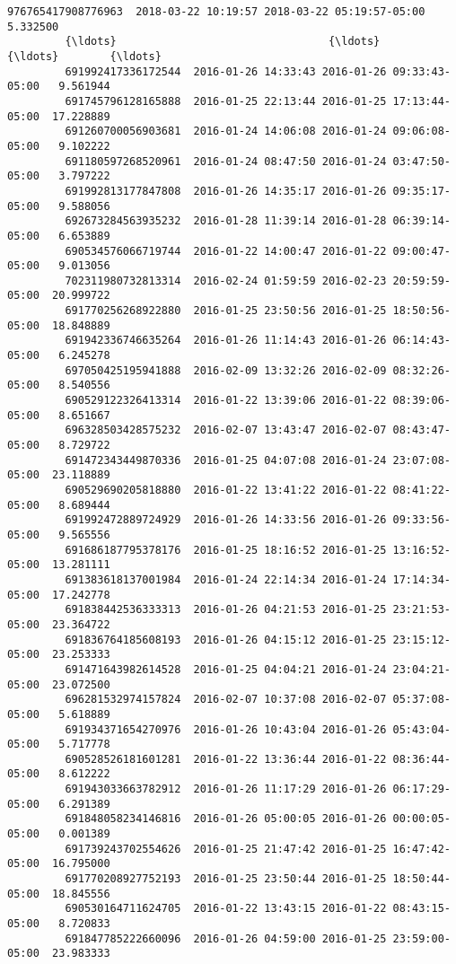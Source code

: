 \documentclass[11pt]{article}
\begin{document}
\begin{Verbatim}[commandchars=\\\{\}]
         976765417908776963  2018-03-22 10:19:57 2018-03-22 05:19:57-05:00   5.332500   
         {\ldots}                                 {\ldots}                       {\ldots}        {\ldots}   
         691992417336172544  2016-01-26 14:33:43 2016-01-26 09:33:43-05:00   9.561944   
         691745796128165888  2016-01-25 22:13:44 2016-01-25 17:13:44-05:00  17.228889   
         691260700056903681  2016-01-24 14:06:08 2016-01-24 09:06:08-05:00   9.102222   
         691180597268520961  2016-01-24 08:47:50 2016-01-24 03:47:50-05:00   3.797222   
         691992813177847808  2016-01-26 14:35:17 2016-01-26 09:35:17-05:00   9.588056   
         692673284563935232  2016-01-28 11:39:14 2016-01-28 06:39:14-05:00   6.653889   
         690534576066719744  2016-01-22 14:00:47 2016-01-22 09:00:47-05:00   9.013056   
         702311980732813314  2016-02-24 01:59:59 2016-02-23 20:59:59-05:00  20.999722   
         691770256268922880  2016-01-25 23:50:56 2016-01-25 18:50:56-05:00  18.848889   
         691942336746635264  2016-01-26 11:14:43 2016-01-26 06:14:43-05:00   6.245278   
         697050425195941888  2016-02-09 13:32:26 2016-02-09 08:32:26-05:00   8.540556   
         690529122326413314  2016-01-22 13:39:06 2016-01-22 08:39:06-05:00   8.651667   
         696328503428575232  2016-02-07 13:43:47 2016-02-07 08:43:47-05:00   8.729722   
         691472343449870336  2016-01-25 04:07:08 2016-01-24 23:07:08-05:00  23.118889   
         690529690205818880  2016-01-22 13:41:22 2016-01-22 08:41:22-05:00   8.689444   
         691992472889724929  2016-01-26 14:33:56 2016-01-26 09:33:56-05:00   9.565556   
         691686187795378176  2016-01-25 18:16:52 2016-01-25 13:16:52-05:00  13.281111   
         691383618137001984  2016-01-24 22:14:34 2016-01-24 17:14:34-05:00  17.242778   
         691838442536333313  2016-01-26 04:21:53 2016-01-25 23:21:53-05:00  23.364722   
         691836764185608193  2016-01-26 04:15:12 2016-01-25 23:15:12-05:00  23.253333   
         691471643982614528  2016-01-25 04:04:21 2016-01-24 23:04:21-05:00  23.072500   
         696281532974157824  2016-02-07 10:37:08 2016-02-07 05:37:08-05:00   5.618889   
         691934371654270976  2016-01-26 10:43:04 2016-01-26 05:43:04-05:00   5.717778   
         690528526181601281  2016-01-22 13:36:44 2016-01-22 08:36:44-05:00   8.612222   
         691943033663782912  2016-01-26 11:17:29 2016-01-26 06:17:29-05:00   6.291389   
         691848058234146816  2016-01-26 05:00:05 2016-01-26 00:00:05-05:00   0.001389   
         691739243702554626  2016-01-25 21:47:42 2016-01-25 16:47:42-05:00  16.795000   
         691770208927752193  2016-01-25 23:50:44 2016-01-25 18:50:44-05:00  18.845556   
         690530164711624705  2016-01-22 13:43:15 2016-01-22 08:43:15-05:00   8.720833   
         691847785222660096  2016-01-26 04:59:00 2016-01-25 23:59:00-05:00  23.983333   
         

\end{Verbatim}
\end{document}
